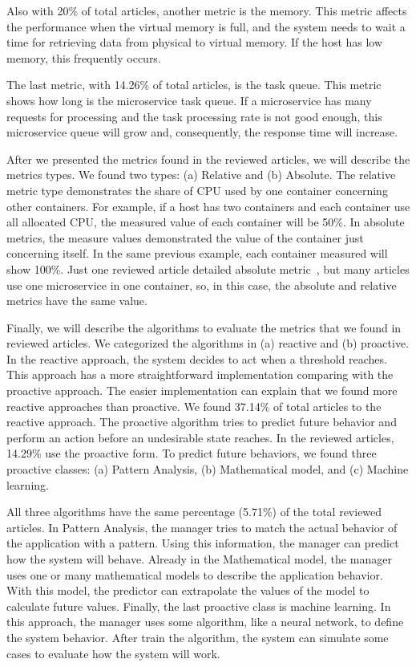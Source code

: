 Also with 20\% of total articles, another metric is the memory. This metric affects the performance when the virtual memory is full, and the system needs to wait a time for retrieving data from physical to virtual memory. If the host has low memory, this frequently occurs. 

The last metric, with 14.26\% of total articles, is the task queue. This metric shows how long is the microservice task queue. If a microservice has many requests for processing and the task processing rate is not good enough, this microservice queue will grow and, consequently, the response time will increase. 

After we presented the metrics found in the reviewed articles, we will describe the metrics types. We found two types: (a) Relative and (b) Absolute. The relative metric type demonstrates the share of CPU used by one container concerning other containers. For example, if a host has two containers and each container use all allocated CPU, the measured value of each container will be 50\%. In absolute metrics, the measure values demonstrated the value of the container just concerning itself. In the same previous example, each container measured will show 100\%. Just one reviewed article detailed absolute metric~\cite{Casalicchio2017}, but many articles use one microservice in one container, so, in this case, the absolute and relative metrics have the same value.

Finally, we will describe the algorithms to evaluate the metrics that we found in reviewed articles. We categorized the algorithms in (a) reactive and (b) proactive. In the reactive approach, the system decides to act when a threshold reaches. This approach has a more straightforward implementation comparing with the proactive approach. The easier implementation can explain that we found more reactive approaches than proactive. We found 37.14\% of total articles to the reactive approach. The proactive algorithm tries to predict future behavior and perform an action before an undesirable state reaches. In the reviewed articles, 14.29\% use the proactive form. To predict future behaviors, we found three proactive classes: (a) Pattern Analysis, (b) Mathematical model, and (c) Machine learning. 

All three algorithms have the same percentage (5.71\%) of the total reviewed articles. In Pattern Analysis, the manager tries to match the actual behavior of the application with a pattern. Using this information, the manager can predict how the system will behave. Already in the Mathematical model, the manager uses one or many mathematical models to describe the application behavior. With this model, the predictor can extrapolate the values of the model to calculate future values. Finally, the last proactive class is machine learning. In this approach, the manager uses some algorithm, like a neural network, to define the system behavior. After train the algorithm, the system can simulate some cases to evaluate how the system will work. 

